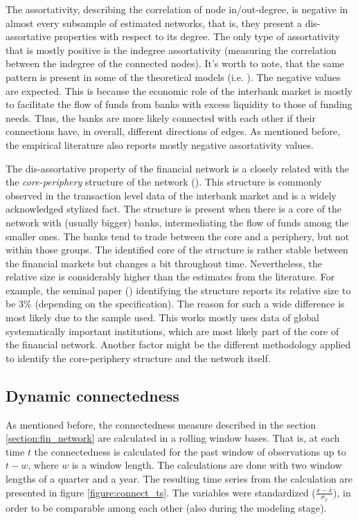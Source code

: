 \documentclass[12pt]{article}
\begin{document}
The assortativity, describing the correlation of node in/out-degree, is negative in almost every subsample of estimated networks, that is, they present a dis-assortative properties with respect to its degree. The only type of assortativity that is mostly positive is the indegree assortativity (measuring the correlation between the indegree of the connected nodes). It's worth to note, that the same pattern is present in some of the theoretical models (i.e. \cite{aldasoro17}). The negative values are expected. This is because the economic role of the interbank market is mostly to facilitate the flow of funds from banks with excess liquidity to those of funding needs. Thus, the banks are more likely connected with each other if their connections have, in overall, different directions of edges. As mentioned before, the empirical literature also reports mostly negative assortativity values.

The dis-assortative property of the financial network is a closely related  with the the \textit{core-periphery} structure of the network (\cite{craig14}). This structure is commonly observed in the transaction level data of the interbank market and is a widely acknowledged stylized fact. The structure is present when there is a core of the network with (usually bigger) banks, intermediating the flow of funds among the smaller ones. The banks tend to trade between the core and a periphery, but not within those groups. The identified core of the structure is rather stable between the financial markets but changes a bit throughout time. Nevertheless, the relative size is considerably higher than the estimates from the literature. For example, the seminal paper (\cite{craig14}) identifying the structure reports its relative size to be 3\% (depending on the specification). The reason for such a wide difference is most likely due to the sample used. This works mostly uses data of global systematically important institutions, which are most likely part of the core of the financial network. Another factor might be the different methodology applied to identify the core-periphery structure and the network itself. 

\subsection{Dynamic connectedness}

As mentioned before, the connectedness measure described in the section 
\ref{section:fin_network} are calculated in a rolling window bases. That is, at each time $t$ the connectedness is calculated for the past window of observations up to $t - w$, where $w$ is a window length. The calculations are done with two window lengths of a quarter and a year. The resulting time series from the calculation are presented in figure \ref{figure:connect_ts}. The variables were standardized ($\frac{x - \bar{x}}{\sigma_{x}}$), in order to be comparable among each other (also during the modeling stage).
\end{document}

